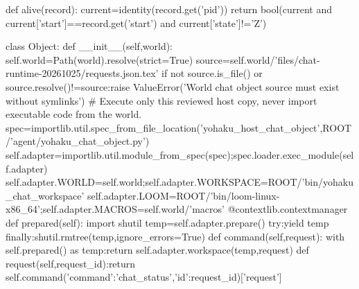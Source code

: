 def alive(record):
    current=identity(record.get('pid'))
    return bool(current and current['start']==record.get('start') and current['state']!='Z')


class Object:
    def __init__(self,world):
        self.world=Path(world).resolve(strict=True)
        source=self.world/'files/chat-runtime-20261025/requests.json.tex'
        if not source.is_file() or source.resolve()!=source:raise ValueError('World chat object source must exist without symlinks')
        # Execute only this reviewed host copy, never import executable code from the world.
        spec=importlib.util.spec_from_file_location('yohaku_host_chat_object',ROOT/'agent/yohaku_chat_object.py')
        self.adapter=importlib.util.module_from_spec(spec);spec.loader.exec_module(self.adapter)
        self.adapter.WORLD=self.world;self.adapter.WORKSPACE=ROOT/'bin/yohaku_chat_workspace'
        self.adapter.LOOM=ROOT/'bin/loom-linux-x86_64';self.adapter.MACROS=self.world/'macros'
    @contextlib.contextmanager
    def prepared(self):
        import shutil
        temp=self.adapter.prepare()
        try:yield temp
        finally:shutil.rmtree(temp,ignore_errors=True)
    def command(self,request):
        with self.prepared() as temp:return self.adapter.workspace(temp,request)
    def request(self,request_id):return self.command({'command':'chat_status','id':request_id})['request']



